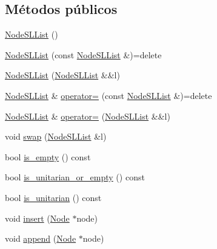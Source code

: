 \subsection*{Métodos públicos}
\begin{DoxyCompactItemize}
\item 
\hyperlink{class_designar_1_1_node_s_l_list_a110541373e8c54e124136d6c82861e6b}{Node\+S\+L\+List} ()
\item 
\hyperlink{class_designar_1_1_node_s_l_list_af304750ff400323ae47d280a4646f2dc}{Node\+S\+L\+List} (const \hyperlink{class_designar_1_1_node_s_l_list}{Node\+S\+L\+List} \&)=delete
\item 
\hyperlink{class_designar_1_1_node_s_l_list_a89bc16ab51fd2e30a80d59e189ed194c}{Node\+S\+L\+List} (\hyperlink{class_designar_1_1_node_s_l_list}{Node\+S\+L\+List} \&\&l)
\item 
\hyperlink{class_designar_1_1_node_s_l_list}{Node\+S\+L\+List} \& \hyperlink{class_designar_1_1_node_s_l_list_a31a9e8aea9795ba5c2bf4f146f8cfe57}{operator=} (const \hyperlink{class_designar_1_1_node_s_l_list}{Node\+S\+L\+List} \&)=delete
\item 
\hyperlink{class_designar_1_1_node_s_l_list}{Node\+S\+L\+List} \& \hyperlink{class_designar_1_1_node_s_l_list_a1b35741a071a185842be3604b44fc003}{operator=} (\hyperlink{class_designar_1_1_node_s_l_list}{Node\+S\+L\+List} \&\&l)
\item 
void \hyperlink{class_designar_1_1_node_s_l_list_a4913c5234738bd3cb054785c25839420}{swap} (\hyperlink{class_designar_1_1_node_s_l_list}{Node\+S\+L\+List} \&l)
\item 
bool \hyperlink{class_designar_1_1_node_s_l_list_a08193f474acd49c5dd135abc529f934f}{is\+\_\+empty} () const
\item 
bool \hyperlink{class_designar_1_1_node_s_l_list_a82d5d8f34935b87b9032b5dcdf2caea0}{is\+\_\+unitarian\+\_\+or\+\_\+empty} () const
\item 
bool \hyperlink{class_designar_1_1_node_s_l_list_a1d0b560b0f1bfc9a40eb405d0cc22a59}{is\+\_\+unitarian} () const
\item 
void \hyperlink{class_designar_1_1_node_s_l_list_aa6b522a7d687f39959d93ebc80903261}{insert} (\hyperlink{class_designar_1_1_node_s_l_list_a41963019ada1025099e3259207a3de96}{Node} $\ast$node)
\item 
void \hyperlink{class_designar_1_1_node_s_l_list_a292f57c43bc8c2521e2865f5d431ccf6}{append} (\hyperlink{class_designar_1_1_node_s_l_list_a41963019ada1025099e3259207a3de96}{Node} $\ast$node)
\item 

\end{DoxyCompactItemize}
